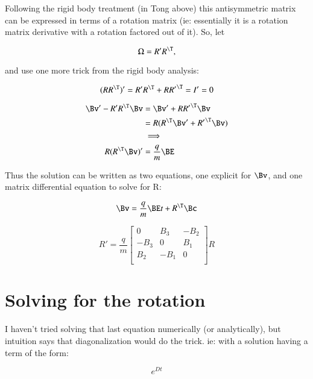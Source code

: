 Following the rigid body treatment (in Tong above) this antisymmetric matrix can be expressed in terms of a rotation matrix (ie: essentially it is a rotation matrix derivative with a rotation factored out of it).  So, let

\begin{equation}\label{eqn:lorentzRotation:n}
\Omega = R' R^\T,
\end{equation}

and use one more trick from the rigid body analysis:

\begin{equation}\label{eqn:lorentzRotation:n}
(RR^\T)' = R' R^\T + R {R'}^\T = I' = 0
\end{equation}

\begin{align*}
\Bv' - R' R^\T \Bv 
&= \Bv' + R {R'}^\T \Bv  \\
&= R (R^\T \Bv' + {R'}^\T \Bv)  \\
&\implies \\
R (R^\T \Bv)' &= \frac{q}{m} \BE
\end{align*}

Thus the solution can be written as two equations, one explicit for $\Bv$, and one matrix differential equation to solve for R:

\begin{equation}\label{eqn:lorentzRotation:n}
\Bv = \frac{q}{m} \BE t + R^\T \Bc
\end{equation}

\begin{equation}\label{eqn:lorentzRotation:n}
R' = \frac{q}{m}
\begin{bmatrix}
0 & B_3 & -B_2 \\
-B_3 & 0 & B_1 \\
B_2 & -B_1 & 0 \\
\end{bmatrix}
R
\end{equation}

\section{Solving for the rotation}

I haven't tried solving that last equation numerically (or analytically), but intuition says that diagonalization would do the trick.  ie: with a solution having a term of the form:

\begin{equation}\label{eqn:lorentzRotation:n}
e^{Dt}
\end{equation}

